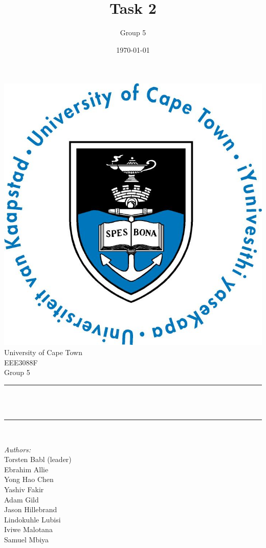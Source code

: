 \documentclass[12pt]{article}
\title{Task 2}								%
\author{Group 5}								%
\date{\today}											%
\makeatletter
\let\thetitle\@title
\makeatother
\begin{document}

\begin{titlepage}
	\centering
    \vspace*{0.5 cm}
    \includegraphics[scale = 0.75]{UCT.jpg}\\[1.0 cm]	%
    \LARGE University of Cape Town\\[1.0 cm]	%
	\Large EEE3088F\\				%
	\large Group 5\\				%
	\rule{\linewidth}{0.2 mm} \\[0.4 cm]
	{ \huge \bfseries \thetitle}\\
	\rule{\linewidth}{0.2 mm} \\[0.5 cm]
	
	\begin{minipage}{0.4\textwidth}
		\begin{flushleft} \large
			\emph{Authors:}\\
      Torsten Babl (leader)\\
      Ebrahim Allie\\
      Yong Hao Chen\\
      Yashiv Fakir\\
      Adam Gild\\
      Jason Hillebrand\\
      Lindokuhle Lubisi\\
      Iviwe Malotana\\
      Samuel Mbiya
      

\end{flushleft}
\end{minipage}
\end{titlepage}
\end{document}
